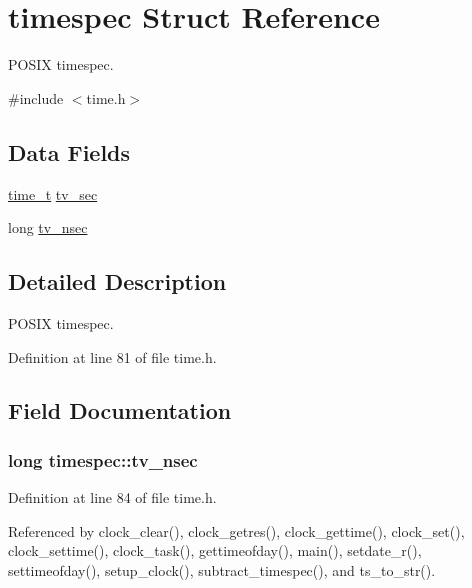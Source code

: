 \hypertarget{structtimespec}{\section{timespec Struct Reference}
\label{structtimespec}
}


P\-O\-S\-I\-X timespec.  




{\ttfamily \#include $<$time.\-h$>$}

\subsection*{Data Fields}
\begin{DoxyCompactItemize}
\item 
\hyperlink{posix_8h_a3346b04b0420b32ccf6b706551b70762}{time\-\_\-t} \hyperlink{structtimespec_afc3302668d7cb5952f590da69fdd4955}{tv\-\_\-sec}
\item 
long \hyperlink{structtimespec_ae3c7510dafa8cbcaede866ed13c99683}{tv\-\_\-nsec}
\end{DoxyCompactItemize}


\subsection{Detailed Description}
P\-O\-S\-I\-X timespec. 

Definition at line 81 of file time.\-h.



\subsection{Field Documentation}
\hypertarget{structtimespec_ae3c7510dafa8cbcaede866ed13c99683}{
\subsubsection[{tv\-\_\-nsec}]{\setlength{\rightskip}{0pt plus 5cm}long timespec\-::tv\-\_\-nsec}}\label{structtimespec_ae3c7510dafa8cbcaede866ed13c99683}


Definition at line 84 of file time.\-h.



Referenced by clock\-\_\-clear(), clock\-\_\-getres(), clock\-\_\-gettime(), clock\-\_\-set(), clock\-\_\-settime(), clock\-\_\-task(), gettimeofday(), main(), setdate\-\_\-r(), settimeofday(), setup\-\_\-clock(), subtract\-\_\-timespec(), and ts\-\_\-to\-\_\-str().

